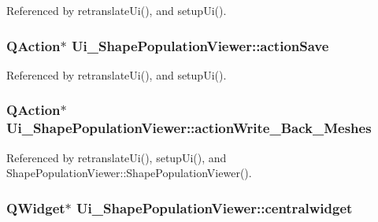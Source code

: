 Referenced by retranslate\-Ui(), and setup\-Ui().

\hypertarget{class_ui___shape_population_viewer_a5528a51653195ff23ff1c8f0b07f3a71}{
\subsubsection[{action\-Save}]{\setlength{\rightskip}{0pt plus 5cm}Q\-Action$\ast$ Ui\-\_\-\-Shape\-Population\-Viewer\-::action\-Save}}\label{class_ui___shape_population_viewer_a5528a51653195ff23ff1c8f0b07f3a71}


Referenced by retranslate\-Ui(), and setup\-Ui().

\hypertarget{class_ui___shape_population_viewer_ab48a26c5d53762d6669813fe1f6ccfaf}{
\subsubsection[{action\-Write\-\_\-\-Back\-\_\-\-Meshes}]{\setlength{\rightskip}{0pt plus 5cm}Q\-Action$\ast$ Ui\-\_\-\-Shape\-Population\-Viewer\-::action\-Write\-\_\-\-Back\-\_\-\-Meshes}}\label{class_ui___shape_population_viewer_ab48a26c5d53762d6669813fe1f6ccfaf}


Referenced by retranslate\-Ui(), setup\-Ui(), and Shape\-Population\-Viewer\-::\-Shape\-Population\-Viewer().

\hypertarget{class_ui___shape_population_viewer_aeb8fec16684660d1702cf2d4f1d12f2f}{
\subsubsection[{centralwidget}]{\setlength{\rightskip}{0pt plus 5cm}Q\-Widget$\ast$ Ui\-\_\-\-Shape\-Population\-Viewer\-::centralwidget}}\label{class_ui___shape_population_viewer_aeb8fec16684660d1702cf2d4f1d12f2f}


